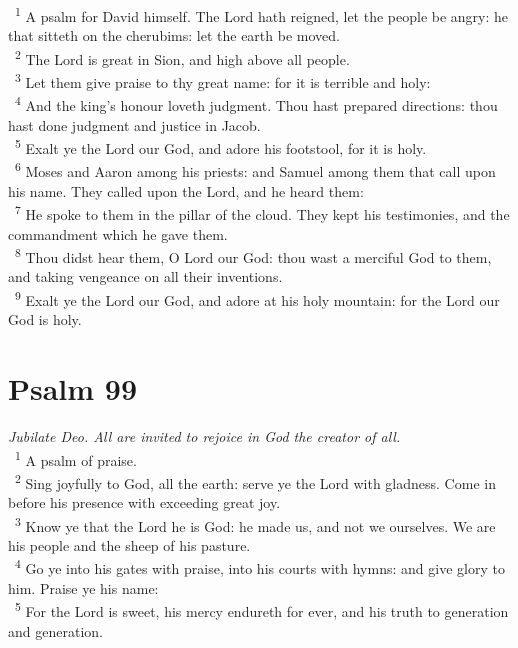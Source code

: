 \documentclass[a5paper,12pt]{article}
\begin{document}
\begin{multicols*}{2}
~\textsuperscript{1} A psalm for David himself. The Lord hath reigned, let the people be angry: he that sitteth on the cherubims: let the earth be moved.\\
~\textsuperscript{2} The Lord is great in Sion, and high above all people.\\
~\textsuperscript{3} Let them give praise to thy great name: for it is terrible and holy:\\
~\textsuperscript{4} And the king's honour loveth judgment. Thou hast prepared directions: thou hast done judgment and justice in Jacob.\\
~\textsuperscript{5} Exalt ye the Lord our God, and adore his footstool, for it is holy.\\
~\textsuperscript{6} Moses and Aaron among his priests: and Samuel among them that call upon his name. They called upon the Lord, and he heard them:\\
~\textsuperscript{7} He spoke to them in the pillar of the cloud. They kept his testimonies, and the commandment which he gave them.\\
~\textsuperscript{8} Thou didst hear them, O Lord our God: thou wast a merciful God to them, and taking vengeance on all their inventions.\\
~\textsuperscript{9} Exalt ye the Lord our God, and adore at his holy mountain: for the Lord our God is holy.\\

\section{Psalm 99}
\label{sec:org8457902}
\emph{Jubilate Deo. All are invited to rejoice in God the creator of all.}\\

~\textsuperscript{1} A psalm of praise.\\
~\textsuperscript{2} Sing joyfully to God, all the earth: serve ye the Lord with gladness. Come in before his presence with exceeding great joy.\\
~\textsuperscript{3} Know ye that the Lord he is God: he made us, and not we ourselves. We are his people and the sheep of his pasture.\\
~\textsuperscript{4} Go ye into his gates with praise, into his courts with hymns: and give glory to him. Praise ye his name:\\
~\textsuperscript{5} For the Lord is sweet, his mercy endureth for ever, and his truth to generation and generation.\\


\end{multicols*}
\end{document}
